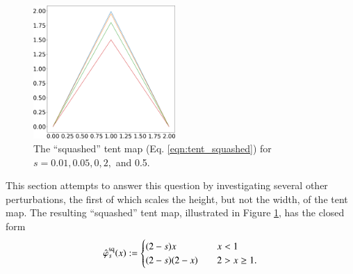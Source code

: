 \documentclass[preprint,12pt]{elsarticle}
\begin{document}
\begin{figure}
    \centering
    \includegraphics[width=0.48\textwidth]{squashed_tent_map.png}
    \caption{The ``squashed'' tent map (Eq. \ref{eqn:tent_squashed}) for $s=0.01, 0.05, 0,2,$ and 0.5.}
    \label{fig:tent_squashed}
\end{figure}

This section attempts to answer this question by investigating several other
perturbations, the first of which scales the height, but not the width,
of the tent map.  The resulting ``squashed'' tent map, illustrated
in Figure \ref{fig:tent_squashed}, has the closed form 
\begin{equation} \label{eqn:tent_squashed}
\hat{\varphi}^{\rm sq}_s(x) := \begin{cases}
    (2-s)x \quad & x < 1 \\
    (2-s)(2 - x) \quad & 2 >  x \ge 1.
    \end{cases}
\end{equation}
\end{document}
